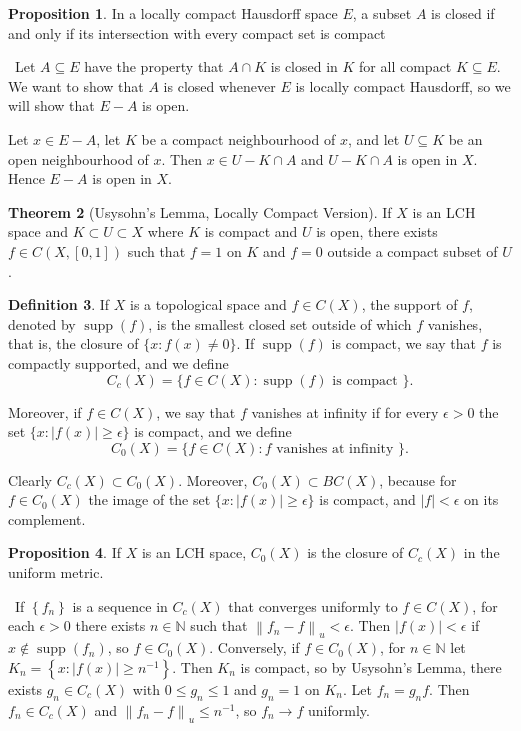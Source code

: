 \documentclass[12pt,a4paper]{book}
\newenvironment{prooff}{{\noindent\it\textcolor{cyan!40!black}{Proof}:}\,}{\par}
\theoremstyle{definition}
\newtheorem{defn}{Definition}[section]
\newtheorem{theo}[defn]{Theorem}
\newtheorem{prop}[defn]{Proposition}
\begin{document}
\begin{prop}
    In a locally compact Hausdorff space $E$, a subset $A$ is closed if and only if its
    intersection with every compact set is compact
\end{prop}
\begin{prooff}
    Let $A \subseteq E$ have the property that $A \cap K$ is closed in $K$ for all compact $K \subseteq E$. We want to show that $A$ is closed whenever $E$ is locally compact Hausdorff, so we will show that $E-A$ is open.

    Let $x \in E- A$, let $K$ be a compact neighbourhood of $x$, and let $U \subseteq K$ be an open neighbourhood of $x$. Then $x\in U-K\cap A$ and $U-K\cap A$ is open in $X$. Hence $E-A$ is open in $X$.
\end{prooff}
\begin{theo}[Usysohn's Lemma, Locally Compact Version]
    If $X$ is an LCH space and $K \subset U \subset X$ where $K$ is compact and $U$ is open, there exists $f \in C(X,[0,1])$ such that $f=1$ on $K$ and $f=0$ outside a compact subset of $U$.
\end{theo}
\begin{defn}
    If $X$ is a topological space and $f \in C(X)$, the support of $f$, denoted by $\operatorname{supp}(f)$, is the smallest closed set outside of which $f$ vanishes, that is, the closure of $\{x: f(x) \neq 0\}$. If $\operatorname{supp}(f)$ is compact, we say that $f$ is compactly supported, and we define
    $$
        C_c(X)=\{f \in C(X): \operatorname{supp}(f) \text { is compact }\} .
    $$

    Moreover, if $f \in C(X)$, we say that $f$ vanishes at infinity if for every $\epsilon>0$ the set $\{x:|f(x)| \geq \epsilon\}$ is compact, and we define
    $$
        C_0(X)=\{f \in C(X): f \text { vanishes at infinity }\} .
    $$

    Clearly $C_c(X) \subset C_0(X)$. Moreover, $C_0(X) \subset B C(X)$, because for $f \in C_0(X)$ the image of the set $\{x:|f(x)| \geq \epsilon\}$ is compact, and $|f|<\epsilon$ on its complement.
\end{defn}
\begin{prop}
    If $X$ is an LCH space, $C_0(X)$ is the closure of $C_c(X)$ in the uniform metric.
\end{prop}
\begin{prooff}
    If $\left\{f_n\right\}$ is a sequence in $C_c(X)$ that converges uniformly
    to $f \in C(X)$, for each $\epsilon>0$ there exists $n \in \mathbb{N}$ such that $\left\|f_n-f\right\|_u<\epsilon$. Then $|f(x)|<\epsilon$ if $x \notin \operatorname{supp}\left(f_n\right)$, so $f \in C_0(X)$. Conversely, if $f \in C_0(X)$, for $n \in \mathbb{N}$ let $K_n=\left\{x:|f(x)| \geq n^{-1}\right\}$. Then $K_n$ is compact,
    so by Usysohn's Lemma, there exists $g_n \in C_c(X)$ with $0 \leq g_n \leq 1$ and $g_n=1$ on $K_n$. Let $f_n=g_n f$. Then $f_n \in C_c(X)$ and $\left\|f_n-f\right\|_u \leq n^{-1}$, so $f_n \rightarrow f$ uniformly.
\end{prooff}
\end{document}
